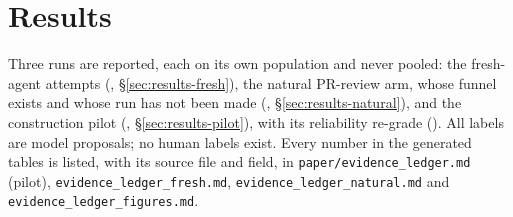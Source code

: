 \section{Results}
\label{sec:results}
Three runs are reported, each on its own population and never pooled: the fresh-agent attempts (\texttt{\FRESHRUN}, \S\ref{sec:results-fresh}), the natural PR-review arm, whose funnel exists and whose run has not been made (\texttt{\NATURALRUN}, \S\ref{sec:results-natural}), and the construction pilot (\texttt{\PILOTRUN}, \S\ref{sec:results-pilot}), with its reliability re-grade (\texttt{\REGRADERUN}). All labels are model proposals; no human labels exist. Every number in the generated tables is listed, with its source file and field, in \texttt{paper/evidence\_ledger.md} (pilot), \texttt{evidence\_ledger\_fresh.md}, \texttt{evidence\_ledger\_natural.md} and \texttt{evidence\_ledger\_figures.md}.




